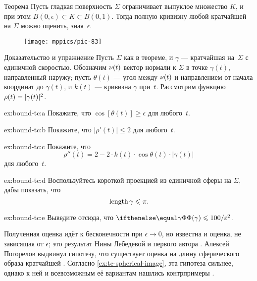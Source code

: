 \begin{thm}{Теорема}\label{thm:tc-of-mingeod}
Пусть гладкая поверхность $\Sigma$ ограничивает выпуклое множество $K$, и при этом $B(0,\epsilon)\subset K\subset B(0,1)$.
Тогда полную кривизну любой кратчайшей на $\Sigma$ можно оценить, зная~$\epsilon$.
\end{thm}

{

\begin{wrapfigure}{r}{48 mm}
\vskip2mm
\centering
\texttt{[image: mppics/pic-83]}
\vskip-0mm
\end{wrapfigure}

\begin{thm}{Доказательство и упражнение}\label{ex:bound-tc}
Пусть $\Sigma$ как в теореме, и $\gamma$ --- кратчайшая на~$\Sigma$ с единичной скоростью.
Обозначим $\nu(t)$ вектор нормали к $\Sigma$ в точке $\gamma(t)$, направленный наружу;
пусть $\theta(t)$ --- угол между $\nu(t)$ и направлением от начала координат до $\gamma(t)$,
и 
$k(t)$ --- кривизна $\gamma$ при~$t$.
Рассмотрим функцию $\rho(t)\z=|\gamma(t)|^2$.


\begin{subthm}{ex:bound-tc:a}
Покажите, что $\cos[\theta(t)]\ge \epsilon$ для любого~$t$.
\end{subthm}

\begin{subthm}{ex:bound-tc:b}
Покажите, что $|\rho'(t)|\le 2$ для любого~$t$.
\end{subthm}

\begin{subthm}{ex:bound-tc:c}
Покажите, что
\[\rho''(t)=2-2\cdot k(t)\cdot \cos \theta(t)\cdot |\gamma(t)|\]
для любого~$t$.
\end{subthm}

\begin{subthm}{ex:bound-tc:d}
Воспользуйтесь короткой проекцией из единичной сферы на $\Sigma$, дабы показать, что
\[\mathop{\rm length}\nolimits \gamma\leqslant \pi.\]
\end{subthm}

\begin{subthm}{ex:bound-tc:e}
Выведите отсюда, что $\tc\gamma\le 100/\epsilon^2$.
\end{subthm}

\end{thm}

}

Полученная оценка идёт к бесконечности при $\epsilon\to 0$,
но известна и оценка, не зависящая от $\epsilon$;
это результат Нины Лебедевой и первого автора \cite{lebedeva-petrunin}.
Алексей Погорелов выдвинул гипотезу, что существует оценка на длину сферического образа кратчайшей \cite{pogorelov}.
Согласно \ref{ex:tc-spherical-image}, эта гипотеза сильнее,
однако к ней и всевозможным её вариантам  нашлись контрпримеры \cite{zalgaller,milka,usov,pach}.
